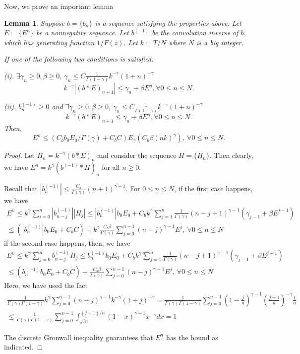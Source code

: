 \documentclass[11pt]{article} %
\newtheorem{lmm}{Lemma}
\begin{document}
Now, we prove an important lemma
\begin{lmm}\label{lmm:stabilitylmm}
Suppose $b=\{b_n\}$ is a sequence satisfying the properties above. Let $E=\{E^n\}$ be a nonnegative sequence. Let $b^{(-1)}$ be the convolution inverse of $b$, which has generating function $1/F(z)$. Let $k=T/N$ where $N$ is a big integer.

If one of the following two conditions is satisfied:

 (i). $\exists \gamma_n\ge 0,\beta\ge 0$, $\gamma_n\le C\frac{1}{\Gamma(1-\gamma)}k^{-\gamma}(1+n)^{-\gamma}$
 $$
k^{-\gamma}|(b*E)_{n+1}|\le \gamma_n+\beta E^n,\forall 0\le n\le N.
$$

(ii). $b^{(-1)}_n\ge 0$ and $\exists \gamma_n\ge0, \beta\ge0$, $\gamma_n\le C\frac{1}{\Gamma(1-\gamma)}k^{-\gamma}(1+n)^{-\gamma}$
$$
k^{-\gamma}(b*E)_{n+1}\le \gamma_n+\beta E^n,\forall 0\le n\le N.
$$
Then, $$
E^n\le (C_bb_0E_0/\Gamma(\gamma)+C_bC)E_{\gamma}(C_b\beta(nk)^{\gamma}),\ \forall 0\le n\le N.
$$
\end{lmm}
\begin{proof}
Let $H_n=k^{-\gamma}(b*E)_{n}$ and consider the sequence $H=\{H_n\}$. Then clearly, we have $E^n=k^{\gamma}(b^{(-1)}*H)_n$ for all $n\ge 0$.

Recall that $|b_n^{(-1)}|\le \frac{C_b}{\Gamma(\gamma)}(n+1)^{\gamma-1}$.  For $0\le n\le N$, if the first case happens, we have 
\begin{gather*}
E^n\le k^{\gamma}\sum_{i=0}^n |b_{n-j}^{(-1)}| |H_{j}|
\le |b_n^{(-1)}|b_0E_0+C_bk^{\gamma}\sum_{j=1}^{n} \frac{1}{\Gamma(\gamma)}(n-j+1)^{\gamma-1}
(\gamma_{j-1}+\beta E^{j-1})\\
\le (|b_n^{(-1)}|b_0E_0+C_bC) +k^{\gamma}\frac{C_b\beta}{\Gamma(\gamma)}\sum_{j=0}^{n-1}(n-j)^{\gamma-1}E^j,\ \forall 0\le n\le N
\end{gather*}
if the second case happens, then, we have 
\begin{gather*}
E^n\le k^{\gamma}\sum_{j=0}^n b_{n-j}^{(-1)} H_{j}
\le b_n^{(-1)}b_0E_0+C_bk^{\gamma}\sum_{j=1}^{n} \frac{1}{\Gamma(\gamma)}(n-j+1)^{\gamma-1}
(\gamma_{j-1}+\beta E^{j-1})\\
\le (b_n^{(-1)}b_0E_0+C_bC)+\frac{C_b\beta}{\Gamma(\gamma)}\sum_{j=0}^{n-1}(n-j)^{\gamma-1}E^j,\ \forall 0\le n\le N
\end{gather*}
Here, we have used the fact
\begin{multline*}
\frac{1}{\Gamma(\gamma)\Gamma(1-\gamma)}k^{\gamma}\sum_{j=0}^{n-1} (n-j)^{\gamma-1}k^{-\gamma}(1+j)^{-\gamma}
=\frac{1}{\Gamma(\gamma)\Gamma(1-\gamma)}\sum_{j=0}^{n-1} (1-\frac{j}{n})^{\gamma-1}(\frac{j+1}{n})^{-\gamma}\frac{1}{n}
\\
\le \frac{1}{\Gamma(\gamma)\Gamma(1-\gamma)}\sum_{j=0}^{n-1}\int_{j/n}^{(j+1)/n}(1-x)^{\gamma-1}x^{-\gamma}dx=1
\end{multline*}



The discrete Gronwall inequality guarantees that $E^n$ has the bound as indicated.
\end{proof}
\end{document}
